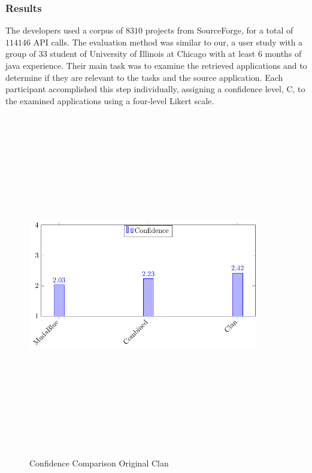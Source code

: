 \subsubsection{Results}
The developers used a corpus of $8310$ projects from SourceForge, for a total of $114146$ API calls. The evaluation method was similar to our, a user study with a group of 33 student of University of Illinois at Chicago with at least 6 months of java experience. Their main task was to examine the retrieved applications and to determine if they are relevant to the tasks and the source application. Each participant accomplished this step individually, assigning a confidence level, C, to the examined applications using a four-level Likert scale.

\begin{figure}[H]
\includegraphics[width=10cm,height=15cm,keepaspectratio]{images/ConfidenceClan.pdf}
\centering
\caption{Confidence Comparison Original Clan}
\label{fig:ConfidenceClan}
\end{figure}

